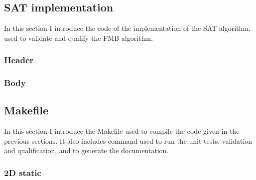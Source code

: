 \documentclass[12pt, a4paper]{article}
\begin{document}
\subsection{SAT implementation}
\label{sat_implementation}

In this section I introduce the code of the implementation of the SAT algorithm, used to validate and qualify the FMB algorithm.\\

\subsubsection{Header}

\begin{scriptsize}
\begin{ttfamily}

\end{ttfamily}
\end{scriptsize}

\subsubsection{Body}

\begin{scriptsize}
\begin{ttfamily}

\end{ttfamily}
\end{scriptsize}

\subsection{Makefile}

In this section I introduce the Makefile used to compile the code given in the previous sections. It also includes command used to run the unit tests, validation and qualification, and to generate the documentation.\\

\begin{scriptsize}
\begin{ttfamily}

\end{ttfamily}
\end{scriptsize}

\subsubsection{2D static}
\end{document}
